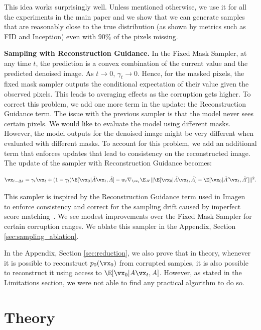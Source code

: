 \documentclass{article}
\begin{document}
This idea works surprisingly well. Unless mentioned otherwise, we use it for all the experiments in the main paper and we show that we can generate samples that are reasonably close to the true distribution (as shown by metrics such as FID and Inception) even with $90\%$ of the pixels missing.



\textbf{Sampling with Reconstruction Guidance.} 
In the Fixed Mask Sampler, at any time $t$, the prediction is a convex combination of the current value and the predicted denoised image. As $t\to 0$, $\gamma_t \to 0$. Hence, for the masked pixels, the fixed mask sampler outputs the conditional expectation of their value given the observed pixels. This leads to averaging effects as the corruption gets higher. To correct this problem, we add one more term in the update: the Reconstruction Guidance term.
The issue with the previous sampler is that the model never sees certain pixels. We would like to evaluate the model using different masks. However, the model outputs for the denoised image might be very different when evaluated with different masks. To account for this problem, we add an additional term that enforces updates that lead to consistency on the reconstructed image. The update of the sampler with Reconstruction Guidance becomes:


\begin{gather}
    \vx_{t- \Delta t} = \gamma_t\vx_t + (1-\gamma_t)\E[\vx_0 | \tilde{A}\vx_t, \tilde{A}] - w_t\nabla_{\vx_t}\E_{A'} || \E[\vx_0 | \tilde{A}\vx_t, \tilde{A}] - \E[\vx_0|\tilde{A}'\vx_t, \tilde{A}']||^2.
\end{gather}

This sampler is inspired by the Reconstruction Guidance term used in Imagen~\citep{ho2022imagen} to enforce consistency and correct for the sampling drift caused by imperfect score matching~\citep{daras2023consistent}. We see modest improvements over the Fixed Mask Sampler for certain corruption ranges. We ablate this sampler in the Appendix, Section \ref{sec:sampling_ablation}.

In the Appendix, Section \ref{sec:reduction}, we also prove that in theory, whenever it is possible to reconstruct $p_0(\vx_0)$ from corrupted samples, it is also possible to reconstruct it using access to $\E[\vx_0|A\vx_t, A]$. However, as stated in the Limitations section, we were not able to find any practical algorithm to do so. 



\section{Theory}
\label{sec:theory}
\end{document}
